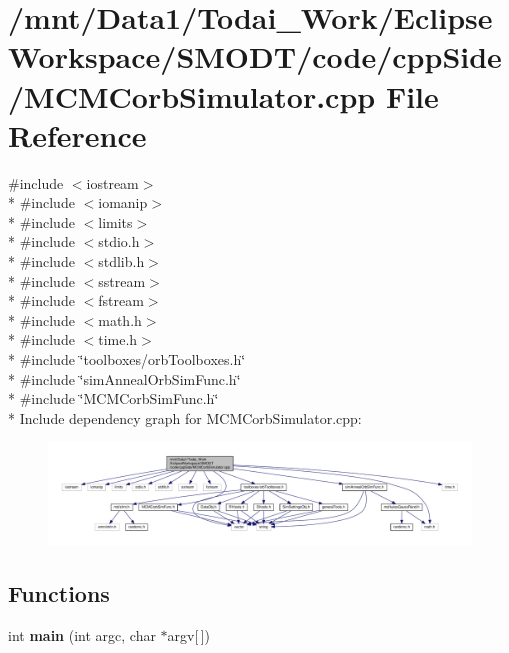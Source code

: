 \section{/mnt/\-Data1/\-Todai\-\_\-\-Work/\-Eclipse\-Workspace/\-S\-M\-O\-D\-T/code/cpp\-Side/\-M\-C\-M\-Corb\-Simulator.cpp File Reference}
\label{_m_c_m_corb_simulator_8cpp}
{\ttfamily \#include $<$iostream$>$}\\*
{\ttfamily \#include $<$iomanip$>$}\\*
{\ttfamily \#include $<$limits$>$}\\*
{\ttfamily \#include $<$stdio.\-h$>$}\\*
{\ttfamily \#include $<$stdlib.\-h$>$}\\*
{\ttfamily \#include $<$sstream$>$}\\*
{\ttfamily \#include $<$fstream$>$}\\*
{\ttfamily \#include $<$math.\-h$>$}\\*
{\ttfamily \#include $<$time.\-h$>$}\\*
{\ttfamily \#include \char`\"{}toolboxes/orb\-Toolboxes.\-h\char`\"{}}\\*
{\ttfamily \#include \char`\"{}sim\-Anneal\-Orb\-Sim\-Func.\-h\char`\"{}}\\*
{\ttfamily \#include \char`\"{}M\-C\-M\-Corb\-Sim\-Func.\-h\char`\"{}}\\*
Include dependency graph for M\-C\-M\-Corb\-Simulator.\-cpp\-:
\nopagebreak
\begin{figure}[H]
\begin{center}
\leavevmode
\includegraphics[width=350pt]{_m_c_m_corb_simulator_8cpp__incl}
\end{center}
\end{figure}
\subsection*{Functions}
\begin{DoxyCompactItemize}
\item 
int {\bf main} (int argc, char $\ast$argv[$\,$])
\end{DoxyCompactItemize}


